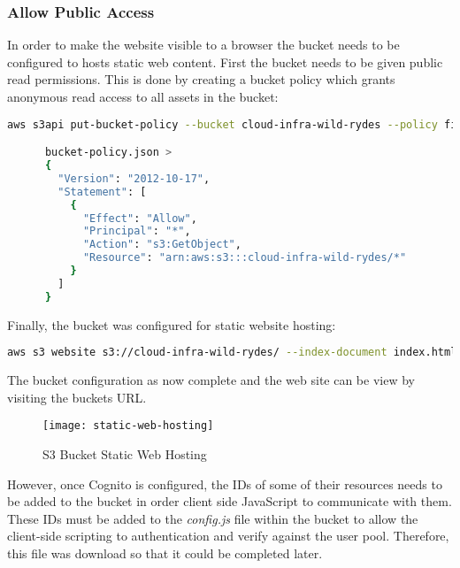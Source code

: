    
  \subsubsection{Allow Public Access}
  
    \noindent In order to make the website visible to a browser the bucket needs to be configured to hosts static web content. First the bucket needs to be given public read permissions. This is done by creating a bucket policy which grants anonymous read access to all assets in the bucket:
    
    \noindent\begin{minipage}{\textwidth}
      \begin{lstlisting}[caption={Add Bucket Read Policy},label=bucket-read,language=bash]
      aws s3api put-bucket-policy --bucket cloud-infra-wild-rydes --policy file://bucket-policy.json

      bucket-policy.json >
      {
        "Version": "2012-10-17",
        "Statement": [
          {
            "Effect": "Allow",
            "Principal": "*",
            "Action": "s3:GetObject",
            "Resource": "arn:aws:s3:::cloud-infra-wild-rydes/*"
          }
        ]
      }      
      \end{lstlisting}
    \end{minipage}
    
    \noindent Finally, the bucket was configured for static website hosting:
    
    \noindent\begin{minipage}{\textwidth}
      \begin{lstlisting}[caption={Configure Bucket for Static Website Hosting},label=bucket-hosting,language=bash]
      aws s3 website s3://cloud-infra-wild-rydes/ --index-document index.html
      \end{lstlisting}
    \end{minipage}
    
    \noindent The bucket configuration as now complete and the web site can be view by visiting the buckets URL.
    
    \begin{figure}[H]
      \caption{S3 Bucket Static Web Hosting}
      \centering
      \texttt{[image: static-web-hosting]}
      \label{fig:static-web-hosting}
    \end{figure}
    
    \noindent However, once Cognito is configured, the IDs of some of their resources needs to be added to the bucket in order client side JavaScript to communicate with them. These IDs must be added to the \textit{config.js} file within the bucket to allow the client-side scripting to authentication and verify against the user pool. Therefore, this file was download so that it could be completed later. 
    
